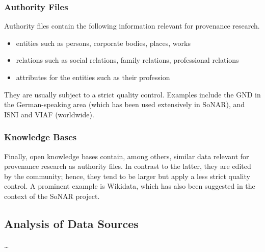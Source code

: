 \subsubsection{Authority Files}

Authority files contain the following information relevant for provenance research.
%
\begin{itemize}
  \item
    entities such as persons, corporate bodies, places, works
  \item
    relations such as social relations, family relations, professional relations
  \item
    attributes for the entities such as their profession
\end{itemize}
%
They are usually subject to a strict quality control.
Examples include the GND in the German-speaking area (which has been used extensively in SoNAR), and ISNI and VIAF (worldwide).

\subsubsection{Knowledge Bases}

Finally, open knowledge bases contain, among others, similar data relevant for provenance research as authority files.
In contrast to the latter, they are edited by the community; hence, they tend to be larger but apply
a less strict quality control. A prominent example is Wikidata, which has also been suggested in the context of the SoNAR project.

\subsection{Analysis of Data Sources}

\dots

\par\bigskip
{}

